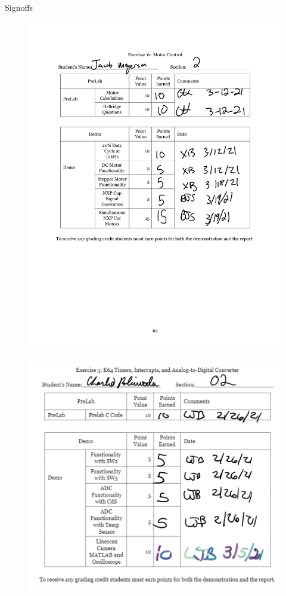 \documentclass{article}
\begin{document}
\centering
\huge{Signoffs}
\begin{figure}[H]
	\centering
  	\includegraphics[width=.7500\textwidth]{Signoff_jm}  
\end{figure}

\begin{figure}[H]
	\centering
  	\includegraphics[width=.7500\textwidth]{Signoff_cp}  
\end{figure}
\end{document}
